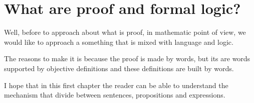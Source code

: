 \chapter{What are proof and formal logic?}
Well, before to approach about what is proof, in mathematic point of view, we would like to approach a something that is mixed with language and logic.

The reasons to make it is because the proof is made by words, but its are words supported by objective definitions and these definitions are built by words.

I hope that in this first chapter the reader can be able to understand the mechanism that divide between sentences, propositions and expressions.

